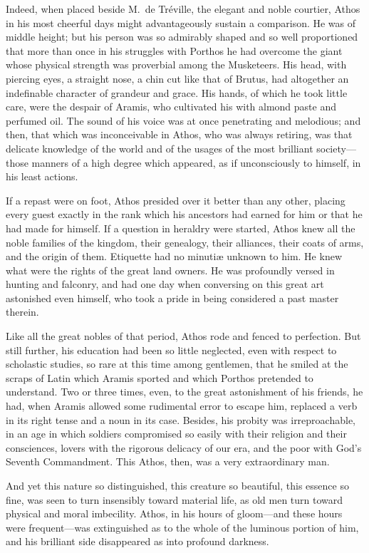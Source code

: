 Indeed, when placed beside M.~de Tréville, the elegant and noble courtier, Athos in his most cheerful days might advantageously sustain a comparison. He was of middle height; but his person was so admirably shaped and so well proportioned that more than once in his struggles with Porthos he had overcome the giant whose physical strength was proverbial among the Musketeers. His head, with piercing eyes, a straight nose, a chin cut like that of Brutus, had altogether an indefinable character of grandeur and grace. His hands, of which he took little care, were the despair of Aramis, who cultivated his with almond paste and perfumed oil. The sound of his voice was at once penetrating and melodious; and then, that which was inconceivable in Athos, who was always retiring, was that delicate knowledge of the world and of the usages of the most brilliant society—those manners of a high degree which appeared, as if unconsciously to himself, in his least actions. 

If a repast were on foot, Athos presided over it better than any other, placing every guest exactly in the rank which his ancestors had earned for him or that he had made for himself. If a question in heraldry were started, Athos knew all the noble families of the kingdom, their genealogy, their alliances, their coats of arms, and the origin of them. Etiquette had no minutiæ unknown to him. He knew what were the rights of the great land owners. He was profoundly versed in hunting and falconry, and had one day when conversing on this great art astonished even  himself, who took a pride in being considered a past master therein. 

Like all the great nobles of that period, Athos rode and fenced to perfection. But still further, his education had been so little neglected, even with respect to scholastic studies, so rare at this time among gentlemen, that he smiled at the scraps of Latin which Aramis sported and which Porthos pretended to understand. Two or three times, even, to the great astonishment of his friends, he had, when Aramis allowed some rudimental error to escape him, replaced a verb in its right tense and a noun in its case. Besides, his probity was irreproachable, in an age in which soldiers compromised so easily with their religion and their consciences, lovers with the rigorous delicacy of our era, and the poor with God's Seventh Commandment. This Athos, then, was a very extraordinary man. 

And yet this nature so distinguished, this creature so beautiful, this essence so fine, was seen to turn insensibly toward material life, as old men turn toward physical and moral imbecility. Athos, in his hours of gloom—and these hours were frequent—was extinguished as to the whole of the luminous portion of him, and his brilliant side disappeared as into profound darkness. 

